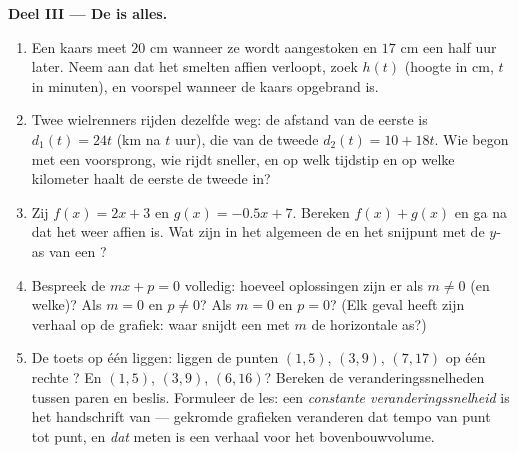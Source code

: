 \begin{problem}
\medskip
\noindent\textbf{Deel III --- De  is alles.}
\begin{enumerate}[resume]
  \item Een kaars meet $20$ cm wanneer ze wordt aangestoken en $17$ cm een half uur
        later. Neem aan dat het smelten affien verloopt, zoek $h(t)$ (hoogte in cm,
        $t$ in minuten), en voorspel wanneer de kaars opgebrand is.
  \item Twee wielrenners rijden dezelfde weg: de afstand van de eerste is
        $d_1(t) = 24t$ (km na $t$ uur), die van de tweede $d_2(t) = 10 + 18t$. Wie
        begon met een voorsprong, wie rijdt sneller, en op welk tijdstip en op welke
        kilometer haalt de eerste de tweede in?
  \item Zij $f(x) = 2x + 3$ en $g(x) = -0.5x + 7$. Bereken $f(x) + g(x)$ en ga na
        dat het weer affien is. Wat zijn in het algemeen de  en
        het snijpunt met de $y$-as van een ?
  \item Bespreek de  $mx + p = 0$ volledig: hoeveel oplossingen zijn er
        als $m \neq 0$ (en welke)? Als $m = 0$ en $p \neq 0$? Als $m = 0$ en
        $p = 0$? (Elk geval heeft zijn verhaal op de grafiek: waar snijdt een 
        met  $m$ de horizontale as?)
  \item De toets op één  liggen: liggen de punten $(1, 5)$, $(3, 9)$,
        $(7, 17)$ op één rechte ? En $(1, 5)$, $(3, 9)$, $(6, 16)$? Bereken de
        veranderingssnelheden tussen paren en beslis. Formuleer de les: een
        \emph{constante veranderingssnelheid} is het handschrift van  --- gekromde grafieken veranderen dat tempo van punt tot punt, en
        \emph{dat} meten
        is een verhaal voor het bovenbouwvolume.
\end{enumerate}
\end{problem}
